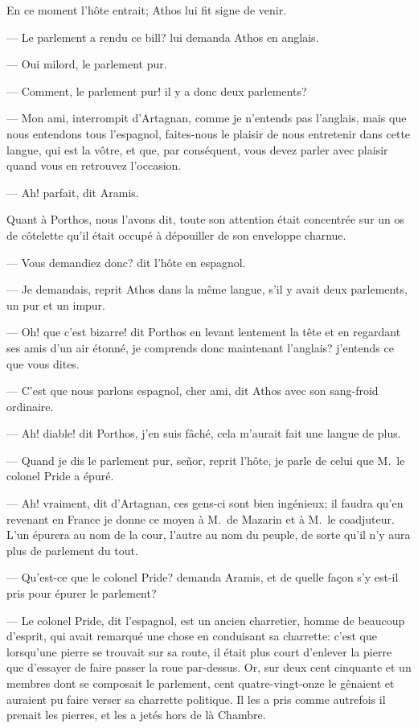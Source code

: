 En ce moment l'hôte entrait; Athos lui fit signe de venir.

— Le parlement a rendu ce bill? lui demanda Athos en anglais.

— Oui milord, le parlement pur.

— Comment, le parlement pur! il y a donc deux parlements?

— Mon ami, interrompit d'Artagnan, comme je n'entends pas l'anglais, mais que nous entendons tous l'espagnol, faites-nous le plaisir de nous entretenir dans cette langue, qui est la vôtre, et que, par conséquent, vous devez parler avec plaisir quand vous en retrouvez l'occasion.

— Ah! parfait, dit Aramis.

Quant à Porthos, nous l'avons dit, toute son attention était concentrée sur un os de côtelette qu'il était occupé à dépouiller de son enveloppe charnue.

— Vous demandiez donc? dit l'hôte en espagnol.

— Je demandais, reprit Athos dans la même langue, s'il y avait deux parlements, un pur et un impur.

— Oh! que c'est bizarre! dit Porthos en levant lentement la tête et en regardant ses amis d'un air étonné, je comprends donc maintenant l'anglais? j'entends ce que vous dites.

— C'est que nous parlons espagnol, cher ami, dit Athos avec son sang-froid ordinaire.

— Ah! diable! dit Porthos, j'en suis fâché, cela m'aurait fait une langue de plus.

— Quand je dis le parlement pur, señor, reprit l'hôte, je parle de celui que M.~le colonel Pride a épuré.

— Ah! vraiment, dit d'Artagnan, ces gens-ci sont bien ingénieux; il faudra qu'en revenant en France je donne ce moyen à M.~de Mazarin et à M.~le coadjuteur. L'un épurera au nom de la cour, l'autre au nom du peuple, de sorte qu'il n'y aura plus de parlement du tout.

— Qu'est-ce que le colonel Pride? demanda Aramis, et de quelle façon s'y est-il pris pour épurer le parlement?

— Le colonel Pride, dit l'espagnol, est un ancien charretier, homme de beaucoup d'esprit, qui avait remarqué une chose en conduisant sa charrette: c'est que lorsqu'une pierre se trouvait sur sa route, il était plus court d'enlever la pierre que d'essayer de faire passer la roue par-dessus. Or, sur deux cent cinquante et un membres dont se composait le parlement, cent quatre-vingt-onze le gênaient et auraient pu faire verser sa charrette politique. Il les a pris comme autrefois il prenait les pierres, et les a jetés hors de là Chambre.

